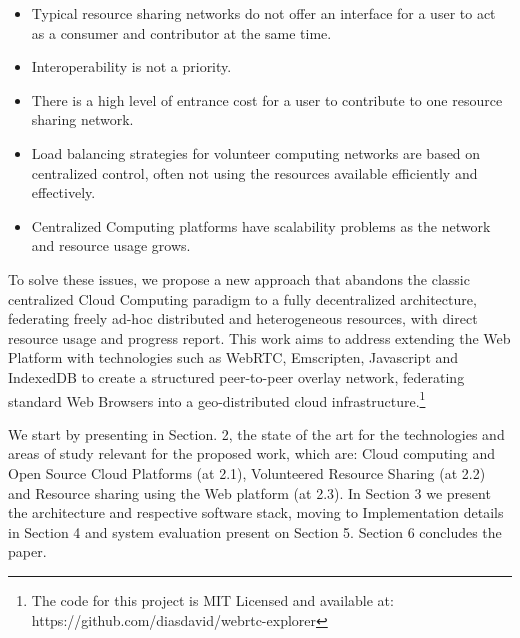\begin{itemize}
    \item Typical resource sharing networks do not offer an interface for a user to act as a consumer and contributor at the same time.
    \item Interoperability is not a priority.
    \item There is a high level of entrance cost for a user to contribute to one resource sharing network.
    \item Load balancing strategies for volunteer computing networks are based on centralized control,  often not using the resources available efficiently and effectively.
    \item Centralized Computing platforms have scalability problems as the network and resource usage grows.
\end{itemize}


To solve these issues, we propose a new approach that abandons the classic centralized Cloud Computing paradigm to a fully decentralized architecture, federating freely ad-hoc distributed and heterogeneous resources, with direct resource usage and progress report. This work aims to address extending the Web Platform with technologies such as WebRTC, Emscripten, Javascript and IndexedDB to create a structured peer-to-peer overlay network, federating standard Web Browsers into a geo-distributed cloud infrastructure.\footnote{The code for this project is MIT Licensed and available at: https://github.com/diasdavid/webrtc-explorer}

We start by presenting in Section. 2, the state of the art for the technologies and areas of study relevant for the proposed work, which are: Cloud computing and Open Source Cloud Platforms (at 2.1), Volunteered Resource Sharing (at 2.2) and Resource sharing using the Web platform (at 2.3). In Section 3 we present the architecture and respective software stack, moving to Implementation details in Section 4 and system evaluation present on Section 5. Section 6 concludes the paper.

